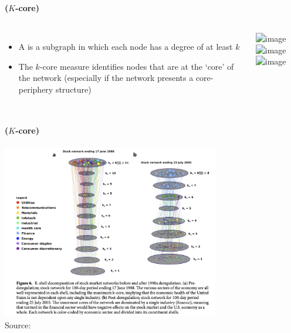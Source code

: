 \documentclass[8pt]{beamer}
\begin{document}



\begin{frame}
\frametitle{\insertsection}
\framesubtitle{\insertsubsection \hspace{0.05cm} ($K$-core)}

\begin{columns}

\begin{itemize}
\item A {\color{blue}{$k$-core}} is a subgraph in which each node has a degree of at least $k$
\item The $k$-core measure identifies nodes that are at the `core' of the network (especially if the network presents a core-periphery structure)
\end{itemize}

\centering
\includegraphics<1>[width=5cm]{base}
\includegraphics<2>[width=5cm]{kc1}
\includegraphics<3>[width=5cm]{kc2}

\end{columns}

\end{frame}


\begin{frame}
\frametitle{\insertsection}
\framesubtitle{\insertsubsection \hspace{0.05cm} ($K$-core)}

\centering
\includegraphics[width=9.5cm]{k_core_sector.png}\\
\tiny{Source: \cite{Burleson-Lesser2020}}

\end{frame}
\end{document}
